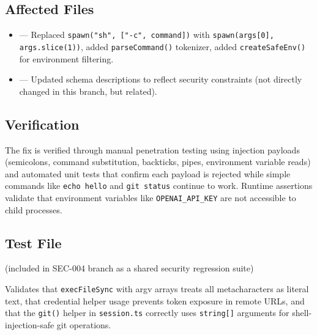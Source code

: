 \subsection*{Affected Files}
\begin{itemize}
    \item {} --- Replaced \texttt{spawn("sh", ["-c", command])} with \texttt{spawn(args[0], args.slice(1))}, added \texttt{parseCommand()} tokenizer, added \texttt{createSafeEnv()} for environment filtering.
    \item {} --- Updated schema descriptions to reflect security constraints (not directly changed in this branch, but related).
\end{itemize}

\subsection*{Verification}
The fix is verified through manual penetration testing using injection payloads (semicolons, command substitution, backticks, pipes, environment variable reads) and automated unit tests that confirm each payload is rejected while simple commands like \texttt{echo hello} and \texttt{git status} continue to work. Runtime assertions validate that environment variables like \texttt{OPENAI\_API\_KEY} are not accessible to child processes.

\subsection*{Test File}
 (included in SEC-004 branch as a shared security regression suite)

Validates that \texttt{execFileSync} with argv arrays treats all metacharacters as literal text, that credential helper usage prevents token exposure in remote URLs, and that the \texttt{git()} helper in \texttt{session.ts} correctly uses \texttt{string[]} arguments for shell-injection-safe git operations.
